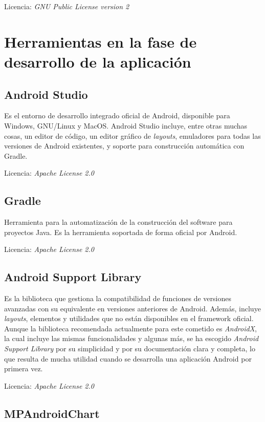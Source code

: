 Licencia: \textit{GNU Public License version 2} 

\section{Herramientas en la fase de desarrollo de la aplicación}

\subsection{Android Studio}

Es el entorno de desarrollo integrado oficial de Android, disponible para Windows, GNU/Linux y MacOS. Android Studio incluye, entre otras muchas cosas, un editor de código, un editor gráfico de \textit{layouts}, emuladores para todas las versiones de Android existentes, y soporte para construcción automática con Gradle. 

Licencia: \textit{Apache License 2.0}

\subsection{Gradle}

Herramienta para la automatización de la construcción del software para proyectos Java. Es la herramienta soportada de forma oficial por Android.

Licencia: \textit{Apache License 2.0} 

\subsection{Android Support Library}

Es la biblioteca que gestiona la compatibilidad de funciones de versiones avanzadas con su equivalente en versiones anteriores de Android. Además, incluye \textit{layouts}, elementos y utilidades que no están disponibles en el framework oficial. Aunque la biblioteca recomendada actualmente para este cometido es \textit{AndroidX}, la cual incluye las mismas funcionalidades y algunas más, se ha escogido \textit{Android Support Library} por su simplicidad y por su documentación clara y completa, lo que resulta de mucha utilidad cuando se desarrolla una aplicación Android por primera vez. 

Licencia: \textit{Apache License 2.0}

\subsection{MPAndroidChart}

